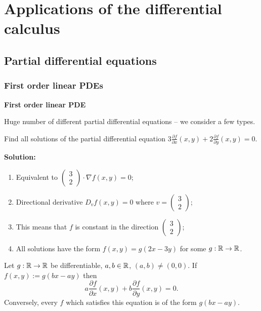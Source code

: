 \chapter{Applications of the differential calculus}

\section{Partial differential equations}

\subsection{First order linear PDEs}


\textbf{First order linear PDE}

Huge number of different partial differential equations -- we consider a few types.

\begin{example}
    Find all solutions of the partial differential equation
    \(3 \frac{\partial f}{\partial x}(x,y) + 2 \frac{\partial f}{\partial y} (x,y) = 0\).
\end{example}

\textbf{Solution:}

\begin{enumerate}
    \item Equivalent to
          \(\left( \begin{smallmatrix}
              3 \\ 2
          \end{smallmatrix} \right)
          \cdot
          \nabla f(x,y) =0\);
    \item Directional derivative \( D_{v}f(x,y) = 0\) where \(v=\left( \begin{smallmatrix}
                  3 \\ 2
              \end{smallmatrix} \right)\);
    \item This means that \(f\) is constant in the direction \(\left( \begin{smallmatrix}
              3 \\ 2
          \end{smallmatrix} \right)\);
    \item All solutions have the form \(f(x,y) = g(2x-3y)\) for some \(g:\mathbb{R} \to \mathbb{R}\).
\end{enumerate}

\begin{theorem}
    Let \(g:\mathbb{R}\to\mathbb{R}\) be differentiable, \(a,b\in \mathbb{R}\), \((a,b)\neq (0,0)\).
    If \(f(x,y):= g(bx-ay)\) then
    \[
        a \frac{\partial f}{\partial x} (x,y) + b \frac{\partial f}{\partial y} (x,y) = 0.
    \]
    Conversely, every \(f\) which satisfies this equation is of the form \(g(bx-ay)\).
\end{theorem}




